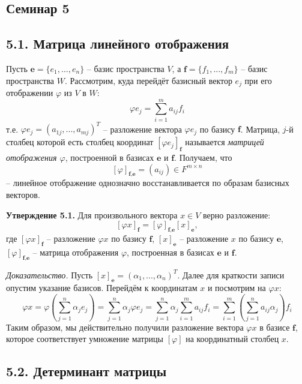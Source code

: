 \documentclass[a4paper, 12pt]{article}
\begin{document}
\begin{spacing}{1.5}
\setlength{\parindent}{0ex}

\section*{Семинар 5}


\subsection*{5.1. Матрица линейного отображения}

Пусть $\textbf{e} = \{e_1, ... , e_n\}$ -- базис пространства $V$, а $\textbf{f} = \{ f_1, ... , f_m\}$ -- базис пространства $W$. Рассмотрим, куда перейдёт базисный вектор $e_j$ при его отображении $\varphi$ из $V$ в $W$:
$$\varphi e_j = \sum_{i=1}^m a_{ij} f_i$$
т.е. $\varphi e_j = (a_{1j}, ... , a_{mj})^T$ -- разложение вектора $\varphi e_j$ по базису $\textbf{f}$. Матрица, $j$-й столбец которой есть столбец координат $[\varphi e_j]_{\textbf{f}}$ называется \textit{матрицей отображения $\varphi$}, построенной в базисах $\textbf{e}$ и $\textbf{f}$. Получаем, что
$$[\varphi]_{\textbf{f,e}} = (a_{ij}) \in F^{m \times n}$$
-- линейное отображение однозначно восстанавливается по образам базисных векторов.

\textbf{Утверждение 5.1.} Для произвольного вектора $x \in V$ верно разложение:
$$[\varphi x]_{\textbf{f}} = [\varphi]_{\textbf{f,e}} [x]_{\textbf{e}},$$
где $[\varphi x]_{\textbf{f}}$ -- разложение $\varphi x$ по базису $\textbf{f}$, $[x]_{\textbf{e}}$ -- разложение $x$ по базису $\textbf{e}$, $[\varphi]_{\textbf{f,e}}$ -- матрица отображения $\varphi$, построенная в базисах $\textbf{e}$ и $\textbf{f}$.

\textit{Доказательство.} Пусть $[x]_{\textbf{e}}= (\alpha_1, ..., \alpha_n)^T$. Далее для краткости записи опустим указание базисов. Перейдём к координатам $x$ и посмотрим на $\varphi x$:
$$\varphi x = \varphi \left ( \sum_{j=1}^n \alpha_j e_j \right ) = \sum_{j=1}^n \alpha_j \varphi e_j = \sum_{j=1}^n \alpha_j \sum_{i=1}^m a_{ij} f_i = \sum_{i=1}^m \left( \sum_{j=1}^n a_{ij} \alpha_j \right) f_i $$
Таким образом, мы действительно получили разложение вектора $\varphi x$ в базисе $\textbf{f}$, которое соответствует умножение матрицы $[\varphi]$ на координатный столбец $x$.


\subsection*{5.2. Детерминант матрицы}


\end{spacing}
\end{document}
